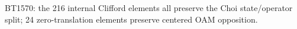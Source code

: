 \begin{center}\small
BT1570: the 216 internal Clifford elements all preserve the Choi state/operator split; 24 zero-translation elements preserve centered OAM opposition.
\end{center}
